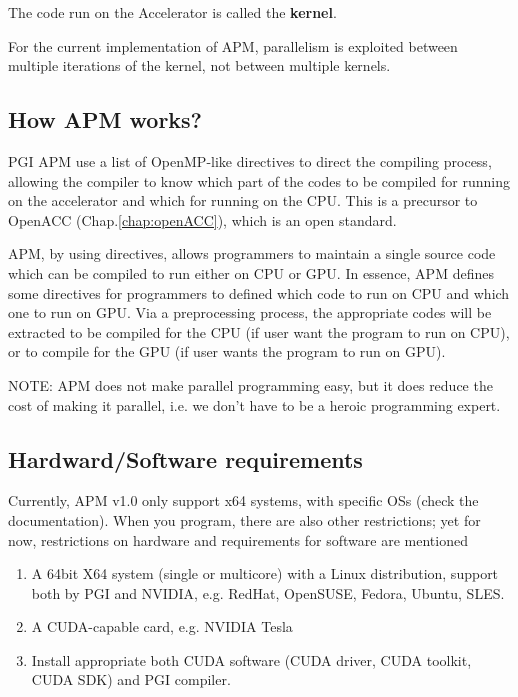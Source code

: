The code run on the Accelerator is called the {\bf kernel}.  

For the current implementation of APM, parallelism is exploited between multiple
iterations of the kernel, not between multiple kernels.

\subsection{How APM works?}

PGI APM use a list of OpenMP-like directives to direct the compiling process,
allowing the compiler to know which part of the codes to be compiled for running
on the accelerator and which for running on the CPU. This is a precursor
to OpenACC (Chap.\ref{chap:openACC}),  which is an open standard.

APM, by using directives, allows programmers to maintain a single source code
which can be compiled to run either on CPU or GPU. In essence, APM defines some
directives for programmers to defined which code to run on CPU and which one to
run on GPU. Via a preprocessing process, the appropriate codes will be extracted
to be compiled for the CPU (if user want the program to run on CPU), or to
compile for the GPU (if user wants the program to run on GPU).

NOTE: APM does not make parallel programming easy, but it does reduce
the cost of making it parallel, i.e. we don't have to be a heroic
programming expert. 

\subsection{Hardward/Software requirements}
\label{sec:hardw-requ-1}

Currently, APM v1.0 only support x64 systems, with specific OSs (check
the documentation). When you program, there are also other
restrictions; yet for now, restrictions on hardware and requirements
for software are mentioned

\begin{enumerate}
\item A 64bit X64 system (single or multicore) with a Linux
  distribution, support both by PGI and NVIDIA, e.g. RedHat, OpenSUSE,
  Fedora, Ubuntu, SLES.
\item A CUDA-capable card, e.g. NVIDIA Tesla
\item Install appropriate both CUDA software (CUDA driver, CUDA
  toolkit, CUDA SDK) and PGI compiler.
\end{enumerate}

